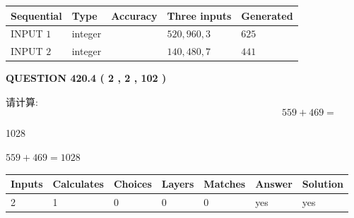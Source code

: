 \documentclass{ctexart}
\begin{document}
   
  
  
\noindent\begin{tabular}{|l|l|l|l|l|}
\hline
 Sequential & Type & Accuracy & Three inputs & Generated \\ 
\hline
 
 
  INPUT $  1 $ & integer &  & $
 520
 , 
 960
 , 
 3
 $ & $ 625 $ 
 \\  \hline  
 
 
  INPUT $  2 $ & integer &  & $
 140
 , 
 480
 , 
 7
 $ & $ 441 $ 
 \\  \hline  
 \end{tabular}
   
   
  
\vspace{0.2in}
  
{\textbf{\Large{QUESTION
420.4 
 ( 2 , 2 , 102 )
}}}
  
  
 
请计算:
\begin{equation}
559 +  %
469 = \nonumber
\end{equation}
 
 
 
\noindent{}
 
 

1028
 
 
\noindent{}
 
 

 
 
 
\noindent{}
 
 

$ %
559 +  %
469=   %
1028$
 
 
\noindent{}
 
 

 
   
   
   
   
\noindent\begin{tabular}{|l|l|l|l|l|l|l|}
 \hline
Inputs & Calculates & Choices & Layers & Matches & Answer & Solution \\ \hline
 2  & 
 1  & 
 0
  & 
 0  & 
 0  & 
  yes & 
  yes 
  \\ \hline
 \end{tabular}
   
\end{document}
